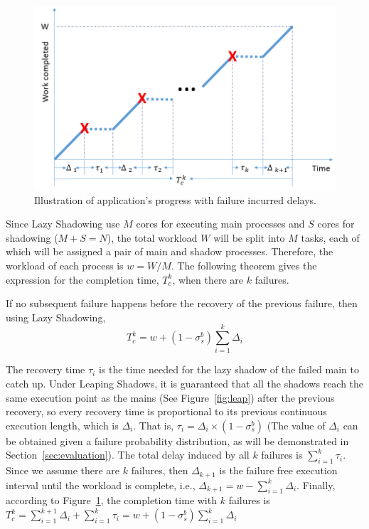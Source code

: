 \begin{figure}[!t]
	\begin{center}
		\includegraphics[width=\columnwidth]{Figures/progress}
	\end{center}
	\caption{Illustration of application's progress with failure incurred delays.}
	\label{fig:progress}
\end{figure}

Since Lazy Shadowing use $M$ cores for executing main processes and $S$ cores for shadowing ($M+S=N$), the total workload $W$ will be split into $M$ tasks, each of which will be assigned a pair of main and shadow processes. Therefore, the workload of each process is 
$w=W/M$. The following theorem gives the expression for the completion time, $T_c^k$, when there are $k$ failures.

\begin{theorem}
If no subsequent failure happens before the recovery of the previous failure, then using Lazy Shadowing, 
	$$T_c^k = w + (1-\sigma_s^b)\sum_{i=1}^k\Delta_i$$
\end{theorem}
\begin{IEEEproof}
The recovery time $\tau_i$ is the time needed for the lazy shadow of the failed main to catch up. Under Leaping Shadows, it is guaranteed that all the shadows reach the same execution point as the mains (See Figure~\ref{fig:leap}) after the previous recovery, so every recovery time is proportional to its previous continuous execution length, which is $\Delta_i$. That is, $\tau_i = \Delta_i \times (1 - \sigma_s^b)$ (The value of $\Delta_i$ can be obtained given a failure probability distribution, as will be demonstrated in Section~\ref{sec:evaluation}). The total delay induced by all $k$ failures is $\sum_{i=1}^k\tau_i$.
Since we assume there are $k$ failures, then $\Delta_{k+1}$ is the failure free execution interval until the workload is complete, i.e., $\Delta_{k+1} = w - \sum_{i=1}^{k}\Delta_i$. Finally, according to Figure~\ref{fig:progress}, the completion time with $k$ failures is 
	$T_c^k = \sum_{i=1}^{k+1}\Delta_i + \sum_{i=1}^k\tau_i = w + (1-\sigma_s^b)\sum_{i=1}^k\Delta_i$
\end{IEEEproof}

